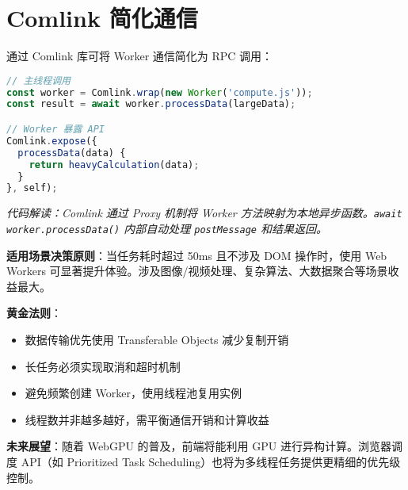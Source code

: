 \section{Comlink 简化通信}
通过 Comlink 库可将 Worker 通信简化为 RPC 调用：\par
\begin{lstlisting}[language=javascript]
// 主线程调用
const worker = Comlink.wrap(new Worker('compute.js'));
const result = await worker.processData(largeData); 

// Worker 暴露 API
Comlink.expose({
  processData(data) {
    return heavyCalculation(data);
  }
}, self);
\end{lstlisting}
\textit{代码解读：Comlink 通过 Proxy 机制将 Worker 方法映射为本地异步函数。\texttt{await worker.processData()} 内部自动处理 \texttt{postMessage} 和结果返回。}\par
\textbf{适用场景决策原则}：当任务耗时超过 50ms 且不涉及 DOM 操作时，使用 Web Workers 可显著提升体验。涉及图像/视频处理、复杂算法、大数据聚合等场景收益最大。\par
\textbf{黄金法则}：\par
\begin{itemize}
\item 数据传输优先使用 Transferable Objects 减少复制开销
\item 长任务必须实现取消和超时机制
\item 避免频繁创建 Worker，使用线程池复用实例
\item 线程数并非越多越好，需平衡通信开销和计算收益
\end{itemize}
\textbf{未来展望}：随着 WebGPU 的普及，前端将能利用 GPU 进行异构计算。浏览器调度 API（如 Prioritized Task Scheduling）也将为多线程任务提供更精细的优先级控制。\par
